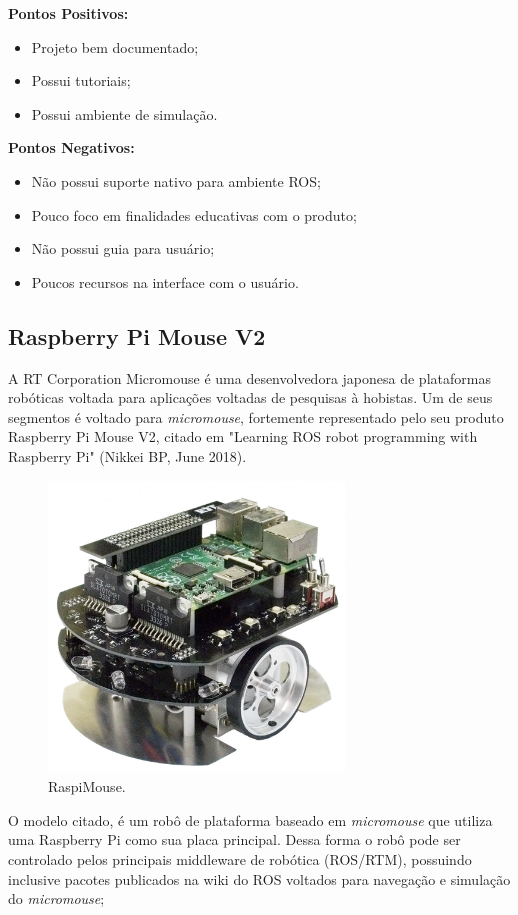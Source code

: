 \textbf{Pontos Positivos:}
\begin{itemize}
	\item Projeto bem documentado;
	\item Possui tutoriais;
	\item Possui ambiente de simulação.
\end{itemize}

\textbf{Pontos Negativos:}
\begin{itemize}
	\item Não possui suporte nativo para ambiente ROS;
	\item Pouco foco em finalidades educativas com o produto;
	\item Não possui guia para usuário;
	\item Poucos recursos na interface com o usuário.
\end{itemize}

\subsection{Raspberry Pi Mouse V2}
\hspace{0.5cm}A RT Corporation Micromouse é uma desenvolvedora japonesa de plataformas robóticas voltada para aplicações  voltadas de pesquisas à hobistas. Um de seus segmentos é voltado para \textit{micromouse}, fortemente representado pelo seu produto Raspberry Pi Mouse V2, citado em "Learning ROS robot programming with Raspberry Pi" (Nikkei BP, June 2018).

\begin{figure}[H]
	\centering
	\includegraphics[width=0.7\textwidth]
	{Figures/RaspiMouse_model.png}
	\caption{\label{fig:RaspiMouse_model} RaspiMouse.}
\end{figure}
 O modelo citado, é um robô de plataforma baseado em \textit{micromouse} que utiliza uma Raspberry Pi como sua placa principal. Dessa forma o robô pode ser controlado pelos principais middleware de robótica (ROS/RTM), possuindo inclusive pacotes publicados na wiki do ROS voltados para navegação e simulação do \textit{micromouse};

